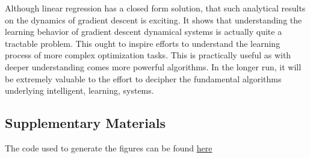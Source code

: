\documentclass[]{article}
\begin{document}
Although linear regression has a closed form solution, that such
analytical results on the dynamics of gradient descent is exciting. It
shows that understanding the learning behavior of gradient descent
dynamical systems is actually quite a tractable problem. This ought to
inspire efforts to understand the learning process of more complex
optimization tasks. This is practically useful as with deeper
understanding comes more powerful algorithms. In the longer run, it will
be extremely valuable to the effort to decipher the fundamental
algorithms underlying intelligent, learning, systems.

\subsection{Supplementary Materials}\label{supplementary-materials}

The code used to generate the figures can be found
\href{https://github.com/theideasmith/theideasmith.github.io/blob/master/_notebooks/AsymptoticConvergence/Asymptotic\%20Convergence\%20of\%20Gradient\%20Descent\%20for\%20Linear\%20Regression\%20Least\%20Squares\%20Optimization.ipynb}{here}
\end{document}
